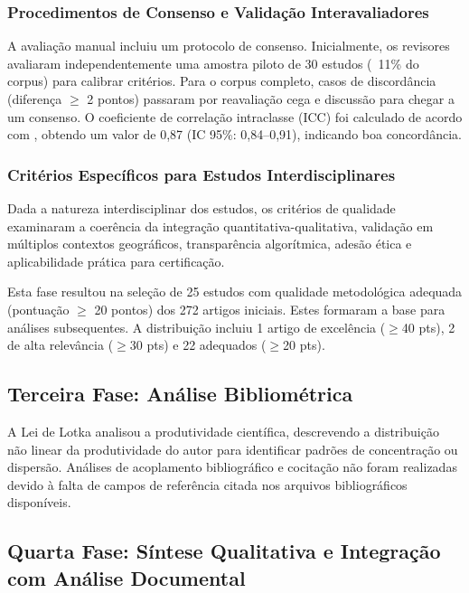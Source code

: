 \subsubsection{Procedimentos de Consenso e Validação Interavaliadores}

A avaliação manual incluiu um protocolo de consenso. Inicialmente, os revisores avaliaram independentemente uma amostra piloto de 30 estudos (~11\% do corpus) para calibrar critérios. Para o corpus completo, casos de discordância (diferença $\geq$ 2 pontos) passaram por reavaliação cega e discussão para chegar a um consenso. O coeficiente de correlação intraclasse (ICC) foi calculado de acordo com  \cite{shrout1979}, obtendo um valor de 0,87 (IC 95\%: 0,84--0,91), indicando boa concordância.

\subsubsection{Critérios Específicos para Estudos Interdisciplinares}
Dada a natureza interdisciplinar dos estudos, os critérios de qualidade examinaram a coerência da integração quantitativa-qualitativa, validação em múltiplos contextos geográficos, transparência algorítmica, adesão ética e aplicabilidade prática para certificação.

Esta fase resultou na seleção de 25 estudos com qualidade metodológica adequada (pontuação $\geq$ 20 pontos) dos 272 artigos iniciais. Estes formaram a base para análises subsequentes. A distribuição incluiu 1 artigo de excelência ($\geq$40 pts), 2 de alta relevância ($\geq$30 pts) e 22 adequados ($\geq$20 pts).

\subsection{Terceira Fase: Análise Bibliométrica}

A Lei de Lotka  \cite{Lotka1926} analisou a produtividade científica, descrevendo a distribuição não linear da produtividade do autor para identificar padrões de concentração ou dispersão. Análises de acoplamento bibliográfico e cocitação não foram realizadas devido à falta de campos de referência citada nos arquivos bibliográficos disponíveis.

\subsection{Quarta Fase: Síntese Qualitativa e Integração com Análise Documental}

